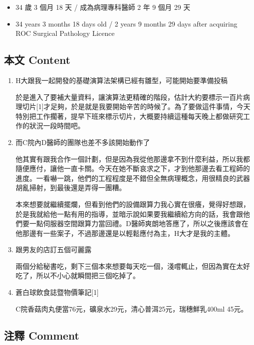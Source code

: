 \documentclass[a5paper, 11pt
]{book}
\providecommand{\tightlist}{%
  \setlength{\itemsep}{0pt}\setlength{\parskip}{0pt}}
\begin{document}
\begin{itemize}
\tightlist
\item
  34 歲 3 個月 18 天 / 成為病理專科醫師 2 年 9 個月 29 天
\item
  34 years 3 months 18 days old / 2 years 9 months 29 days after
  acquiring ROC Surgical Pathology Licence
\end{itemize}

\hypertarget{ux672cux6587-content-61}{%
\subsection{本文 Content}\label{ux672cux6587-content-61}}

\begin{enumerate}
\def\labelenumi{\arabic{enumi}.}
\item
  H大跟我一起開發的基礎演算法架構已經有雛型，可能開始要準備投稿

  於是進入了要補大量資料，讓演算法更精確的階段，估計大約要標示一百片病理切片{[}1{]}才足夠，於是就是我要開始辛苦的時候了。為了要做這件事情，今天特別把工作擱著，提早下班來標示切片，大概要持續這種每天晚上都做研究工作的狀況一段時間吧。
\item
  而C院內D醫師的團隊也差不多該開始動作了

  他其實有跟我合作一個計劃，但是因為我從他那邊拿不到什麼利益，所以我都隨便應付，讓他一直卡關。今天在她不斷哀求之下，才到他那邊去看工程師的進度。一看嚇一跳，他們的工程程度是不錯但全無病理概念，用很精良的武器胡亂掃射，到最後還是弄得一團糟。

  本來想要就繼續擺爛，但看到他們的設備跟算力我心實在很癢，覺得好想跟，於是我就給他一點有用的指導，並暗示說如果要我繼續給方向的話，我會跟他們要一點伺服器空間跟算力當回禮。D醫師爽朗地答應了，所以之後應該會在他那邊有一些案子，不過那邊還是以輕鬆應付為主，H大才是我的主體。
\item
  跟男友的店訂五個可麗露

  兩個分給秘書吃，剩下三個本來想要每天吃一個，淺嚐輒止，但因為實在太好吃了，所以不小心就瞬間把三個吃掉了。
\item
  蒼白球飲食誌暨物價筆記{[}1{]}

  C院香菇肉丸便當76元，礦泉水29元，清心普洱25元，瑞穗鮮乳400ml 45元。
\end{enumerate}

\hypertarget{ux6ce8ux91cb-comment-61}{%
\subsection{注釋 Comment}\label{ux6ce8ux91cb-comment-61}}
\end{document}
